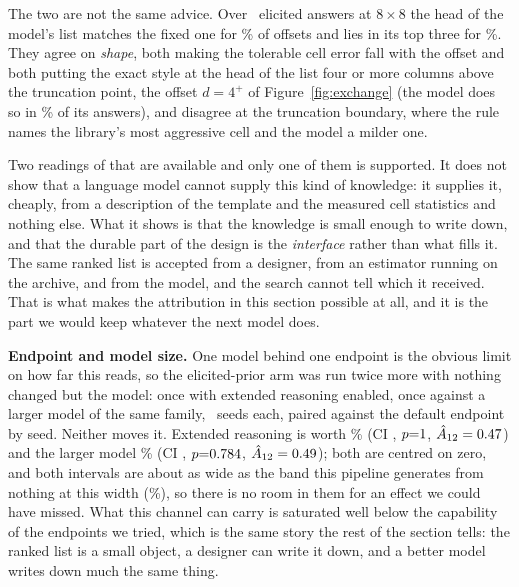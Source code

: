 \documentclass[acmsmall,review,anonymous]{acmart}
\begin{document}
The two are not the same advice.  Over \NPriorAnswers\ elicited answers at
$8\times8$ the head of the model's list matches the fixed one for
\PriorHeadMatch\% of offsets and lies in its top three for \PriorTopThree\%.
They agree on \emph{shape}, both making the tolerable cell error fall with the
offset and both putting the exact style at the head of the list four or more
columns above the truncation point, the offset $d=4^{+}$ of
Figure~\ref{fig:exchange} (the model does so in \PriorExactFar\% of its
answers), and disagree at the truncation boundary, where
the rule names the library's most aggressive cell and the model a milder one.
\PriorText

Two readings of that are available and only one of them is supported.  It does
not show that a language model cannot supply this kind of knowledge: it supplies
it, cheaply, from a description of the template and the measured cell statistics
and nothing else.  What it shows is that the knowledge is small enough to write
down, and that the durable part of the design is the \emph{interface} rather
than what fills it.  The same ranked list is accepted from a designer, from an
estimator running on the archive, and from the model, and the search cannot tell
which it received.  That is what makes the attribution in this section possible
at all, and it is the part we would keep whatever the next model does.

\textbf{Endpoint and model size.}  One model behind one endpoint is
the obvious limit on how far this reads, so the elicited-prior arm was run twice
more with nothing changed but the model: once with extended reasoning enabled,
once against a larger model of the same family, \ThinkN\ seeds each, paired
against the default endpoint by seed.  Neither moves it.  Extended reasoning is
worth \Think\% (CI \ThinkCI, $p{=}1$, $\hat{A}_{12}=0.47$) and the larger
model \Pro\% (CI \ProCI, $p{=}0.784$, $\hat{A}_{12}=0.49$); both are centred on
zero, and both intervals are about as wide as the band this pipeline generates
from nothing at this width (\NullEightN\%), so there is no room in them for an
effect we could have missed.  What this channel can carry is saturated well
below the capability of the endpoints we tried, which is the same story the
rest of the section tells: the ranked list is a small object, a designer can
write it down, and a better model writes down much the same thing.
\end{document}
